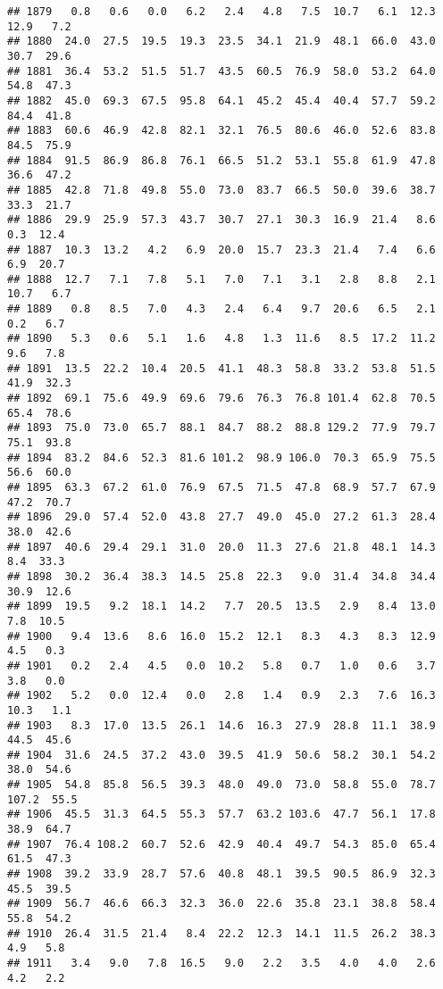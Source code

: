 \documentclass[
]{article}
\begin{document}
\begin{verbatim}
## 1879   0.8   0.6   0.0   6.2   2.4   4.8   7.5  10.7   6.1  12.3  12.9   7.2
## 1880  24.0  27.5  19.5  19.3  23.5  34.1  21.9  48.1  66.0  43.0  30.7  29.6
## 1881  36.4  53.2  51.5  51.7  43.5  60.5  76.9  58.0  53.2  64.0  54.8  47.3
## 1882  45.0  69.3  67.5  95.8  64.1  45.2  45.4  40.4  57.7  59.2  84.4  41.8
## 1883  60.6  46.9  42.8  82.1  32.1  76.5  80.6  46.0  52.6  83.8  84.5  75.9
## 1884  91.5  86.9  86.8  76.1  66.5  51.2  53.1  55.8  61.9  47.8  36.6  47.2
## 1885  42.8  71.8  49.8  55.0  73.0  83.7  66.5  50.0  39.6  38.7  33.3  21.7
## 1886  29.9  25.9  57.3  43.7  30.7  27.1  30.3  16.9  21.4   8.6   0.3  12.4
## 1887  10.3  13.2   4.2   6.9  20.0  15.7  23.3  21.4   7.4   6.6   6.9  20.7
## 1888  12.7   7.1   7.8   5.1   7.0   7.1   3.1   2.8   8.8   2.1  10.7   6.7
## 1889   0.8   8.5   7.0   4.3   2.4   6.4   9.7  20.6   6.5   2.1   0.2   6.7
## 1890   5.3   0.6   5.1   1.6   4.8   1.3  11.6   8.5  17.2  11.2   9.6   7.8
## 1891  13.5  22.2  10.4  20.5  41.1  48.3  58.8  33.2  53.8  51.5  41.9  32.3
## 1892  69.1  75.6  49.9  69.6  79.6  76.3  76.8 101.4  62.8  70.5  65.4  78.6
## 1893  75.0  73.0  65.7  88.1  84.7  88.2  88.8 129.2  77.9  79.7  75.1  93.8
## 1894  83.2  84.6  52.3  81.6 101.2  98.9 106.0  70.3  65.9  75.5  56.6  60.0
## 1895  63.3  67.2  61.0  76.9  67.5  71.5  47.8  68.9  57.7  67.9  47.2  70.7
## 1896  29.0  57.4  52.0  43.8  27.7  49.0  45.0  27.2  61.3  28.4  38.0  42.6
## 1897  40.6  29.4  29.1  31.0  20.0  11.3  27.6  21.8  48.1  14.3   8.4  33.3
## 1898  30.2  36.4  38.3  14.5  25.8  22.3   9.0  31.4  34.8  34.4  30.9  12.6
## 1899  19.5   9.2  18.1  14.2   7.7  20.5  13.5   2.9   8.4  13.0   7.8  10.5
## 1900   9.4  13.6   8.6  16.0  15.2  12.1   8.3   4.3   8.3  12.9   4.5   0.3
## 1901   0.2   2.4   4.5   0.0  10.2   5.8   0.7   1.0   0.6   3.7   3.8   0.0
## 1902   5.2   0.0  12.4   0.0   2.8   1.4   0.9   2.3   7.6  16.3  10.3   1.1
## 1903   8.3  17.0  13.5  26.1  14.6  16.3  27.9  28.8  11.1  38.9  44.5  45.6
## 1904  31.6  24.5  37.2  43.0  39.5  41.9  50.6  58.2  30.1  54.2  38.0  54.6
## 1905  54.8  85.8  56.5  39.3  48.0  49.0  73.0  58.8  55.0  78.7 107.2  55.5
## 1906  45.5  31.3  64.5  55.3  57.7  63.2 103.6  47.7  56.1  17.8  38.9  64.7
## 1907  76.4 108.2  60.7  52.6  42.9  40.4  49.7  54.3  85.0  65.4  61.5  47.3
## 1908  39.2  33.9  28.7  57.6  40.8  48.1  39.5  90.5  86.9  32.3  45.5  39.5
## 1909  56.7  46.6  66.3  32.3  36.0  22.6  35.8  23.1  38.8  58.4  55.8  54.2
## 1910  26.4  31.5  21.4   8.4  22.2  12.3  14.1  11.5  26.2  38.3   4.9   5.8
## 1911   3.4   9.0   7.8  16.5   9.0   2.2   3.5   4.0   4.0   2.6   4.2   2.2

\end{verbatim}
\end{document}
